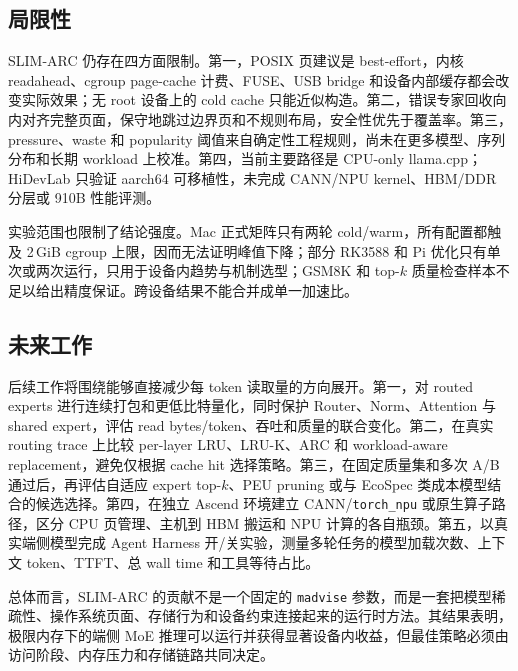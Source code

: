\subsection{局限性}

SLIM-ARC 仍存在四方面限制。第一，POSIX 页建议是 best-effort，内核 readahead、cgroup page-cache 计费、FUSE、USB bridge 和设备内部缓存都会改变实际效果；无 root 设备上的 cold cache 只能近似构造。第二，错误专家回收向内对齐完整页面，保守地跳过边界页和不规则布局，安全性优先于覆盖率。第三，pressure、waste 和 popularity 阈值来自确定性工程规则，尚未在更多模型、序列分布和长期 workload 上校准。第四，当前主要路径是 CPU-only llama.cpp；HiDevLab 只验证 aarch64 可移植性，未完成 CANN/NPU kernel、HBM/DDR 分层或 910B 性能评测。

实验范围也限制了结论强度。Mac 正式矩阵只有两轮 cold/warm，所有配置都触及 2\,GiB cgroup 上限，因而无法证明峰值下降；部分 RK3588 和 Pi 优化只有单次或两次运行，只用于设备内趋势与机制选型；GSM8K 和 top-$k$ 质量检查样本不足以给出精度保证。跨设备结果不能合并成单一加速比。

\subsection{未来工作}

后续工作将围绕能够直接减少每 token 读取量的方向展开。第一，对 routed experts 进行连续打包和更低比特量化，同时保护 Router、Norm、Attention 与 shared expert，评估 read bytes/token、吞吐和质量的联合变化。第二，在真实 routing trace 上比较 per-layer LRU、LRU-K、ARC 和 workload-aware replacement，避免仅根据 cache hit 选择策略。第三，在固定质量集和多次 A/B 通过后，再评估自适应 expert top-$k$、PEU pruning 或与 EcoSpec 类成本模型结合的候选选择。第四，在独立 Ascend 环境建立 CANN/\texttt{torch\_npu} 或原生算子路径，区分 CPU 页管理、主机到 HBM 搬运和 NPU 计算的各自瓶颈。第五，以真实端侧模型完成 Agent Harness 开/关实验，测量多轮任务的模型加载次数、上下文 token、TTFT、总 wall time 和工具等待占比。

总体而言，SLIM-ARC 的贡献不是一个固定的 \texttt{madvise} 参数，而是一套把模型稀疏性、操作系统页面、存储行为和设备约束连接起来的运行时方法。其结果表明，极限内存下的端侧 MoE 推理可以运行并获得显著设备内收益，但最佳策略必须由访问阶段、内存压力和存储链路共同决定。

